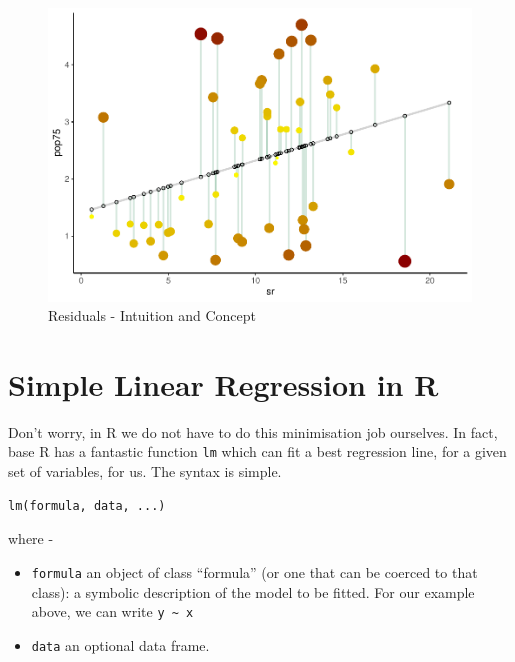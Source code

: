 \documentclass[
]{book}
\providecommand{\tightlist}{%
  \setlength{\itemsep}{0pt}\setlength{\parskip}{0pt}}
\begin{document}
\begin{figure}

{\centering \includegraphics[height=0.35\textheight]{DauR_files/figure-latex/errors-1} 

}

\caption{Residuals - Intuition and Concept}\label{fig:errors}
\end{figure}

\hypertarget{simple-linear-regression-in-r}{%
\section{Simple Linear Regression in R}\label{simple-linear-regression-in-r}}

Don't worry, in R we do not have to do this minimisation job ourselves. In fact, base R has a fantastic function \texttt{lm} which can fit a best regression line, for a given set of variables, for us. The syntax is simple.

\begin{verbatim}
lm(formula, data, ...)
\end{verbatim}

where -

\begin{itemize}
\tightlist
\item
  \texttt{formula} an object of class ``formula'' (or one that can be coerced to that class): a symbolic description of the model to be fitted. For our example above, we can write \texttt{y\ \textasciitilde{}\ x}
\item
  \texttt{data} an optional data frame.
\end{itemize}
\end{document}
